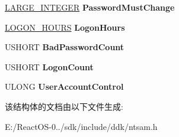 \begin{DoxyCompactItemize}
\item 
\mbox{\label{struct___u_s_e_r___l_o_g_o_n___i_n_f_o_r_m_a_t_i_o_n_a00579aa6d73916fe220d81254fc3574a}} 
\hyperlink{union___l_a_r_g_e___i_n_t_e_g_e_r}{L\+A\+R\+G\+E\+\_\+\+I\+N\+T\+E\+G\+ER} {\bfseries Password\+Must\+Change}
\item 
\mbox{\label{struct___u_s_e_r___l_o_g_o_n___i_n_f_o_r_m_a_t_i_o_n_a3600c93a60b8ab756dec8cb311b54a27}} 
\hyperlink{struct___l_o_g_o_n___h_o_u_r_s}{L\+O\+G\+O\+N\+\_\+\+H\+O\+U\+RS} {\bfseries Logon\+Hours}
\item 
\mbox{\label{struct___u_s_e_r___l_o_g_o_n___i_n_f_o_r_m_a_t_i_o_n_a7cda4980770867e5c3a1ad196a096be9}} 
U\+S\+H\+O\+RT {\bfseries Bad\+Password\+Count}
\item 
\mbox{\label{struct___u_s_e_r___l_o_g_o_n___i_n_f_o_r_m_a_t_i_o_n_a7cead9389a452b9fb1a8c6a413d4cc15}} 
U\+S\+H\+O\+RT {\bfseries Logon\+Count}
\item 
\mbox{\label{struct___u_s_e_r___l_o_g_o_n___i_n_f_o_r_m_a_t_i_o_n_a1ce2bf6f339ffc949e98da00d456ecb0}} 
U\+L\+O\+NG {\bfseries User\+Account\+Control}
\end{DoxyCompactItemize}


该结构体的文档由以下文件生成\+:\begin{DoxyCompactItemize}
\item 
E\+:/\+React\+O\+S-\/0../sdk/include/ddk/ntsam.\+h\end{DoxyCompactItemize}
